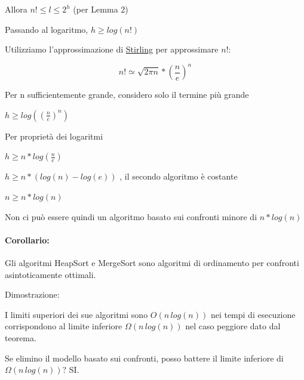 {Allora $n! \leq l \leq 2^h$ (per Lemma 2)}

{Passando al logaritmo, $h \geq log(n!)$}

{Utilizziamo l'approssimazione di \href{https://www.google.com/url?q=https://it.wikipedia.org/wiki/Approssimazione_di_Stirling\&sa=D\&ust=1523379128517000}{Stirling} per approssimare $n!$:}

\begin{equation}
n! \simeq \sqrt{2\pi n }* {(\frac{n}{e})}^n
\end{equation}

{Per n sufficientemente grande, considero solo il termine più grande}

$h \geq log({(\frac{n}{e})}^n)$

{Per proprietà dei logaritmi}

$h \geq n*log(\frac{n}{e})$

{$h \geq n*(log(n) - log(e))$ , il secondo algoritmo è costante}

$n \geq n * log(n)$

{Non ci può essere quindi un algoritmo basato sui confronti minore di $n * log(n)$}

\paragraph{Corollario:}

{Gli algoritmi HeapSort e MergeSort sono algoritmi di ordinamento per confronti asintoticamente ottimali.}

{Dimostrazione:}

{I limiti superiori dei sue algoritmi sono $O(n\,log(n))$ nei tempi di esecuzione corrispondono al limite inferiore $\Omega(n\,log(n))$ nel caso peggiore dato dal teorema.}

{Se elimino il modello basato sui confronti, posso battere il limite inferiore di $\Omega(n\,log(n))$? SI.}
